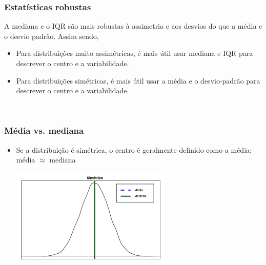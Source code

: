 \begin{frame}
\frametitle{Estatísticas robustas}
\justifying
A mediana e o IQR são mais robustas à assimetria e aos desvios do que a média e o desvio padrão. Assim sendo,

\begin{itemize}
\justifying
\item Para distribuições muito assimétricas, é mais útil usar mediana e IQR para descrever o centro e a variabilidade.
\justifying
\item Para distribuições simétricas, é mais útil usar a média e o desvio-padrão para descrever o centro e a variabilidade.
\end{itemize}

$\:$ \\

\pause
\justifying
{}


\end{frame}


\begin{frame}
\frametitle{Média vs. mediana}

\begin{itemize}
\justifying
\item Se a distribuição é simétrica, o centro é geralmente definido como a média: média $\approx$ mediana

\begin{center}
\includegraphics[width=0.6\textwidth]{1-6_numerical_data/sym.png}
\end{center}

\end{itemize}

\end{frame}

